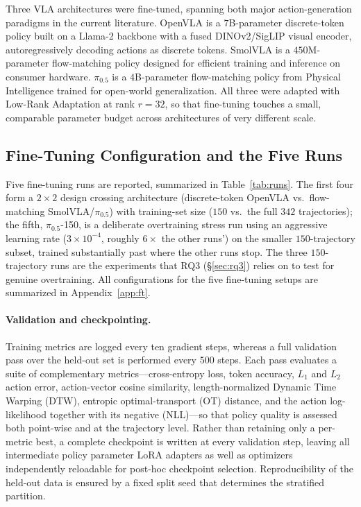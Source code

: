 \documentclass[english,12pt,a4paper,pdftex,elec,utf8]{aaltothesis}
\begin{document}
Three VLA architectures were fine-tuned, spanning both major action-generation paradigms in the current literature. OpenVLA \cite{kim2024openvla} is a $7$B-parameter discrete-token policy built on a Llama-2 backbone with a fused DINOv2/SigLIP visual encoder, autoregressively decoding actions as discrete tokens. SmolVLA \cite{shukor2025smolvla} is a $450$M-parameter flow-matching policy designed for efficient training and inference on consumer hardware. $\pi_{0.5}$ \cite{intelligence2025pi05} is a $4$B-parameter flow-matching policy from Physical Intelligence trained for open-world generalization. All
three were adapted with Low-Rank Adaptation \cite{hu2021loralowrankadaptationlarge} at rank $r{=}32$, so that fine-tuning touches a small, comparable parameter budget across architectures of very different scale.

\subsection{Fine-Tuning Configuration and the Five Runs}
\label{sec:implementation-runs}

Five fine-tuning runs are reported, summarized in Table~\ref{tab:runs}. The first four form a $2\times2$ design crossing architecture (discrete-token OpenVLA vs.\ flow-matching SmolVLA/$\pi_{0.5}$) with training-set size ($150$ vs.\ the full $342$ trajectories); the fifth, $\pi_{0.5}$-150, is a deliberate overtraining stress run using an aggressive learning rate ($3\times10^{-4}$, roughly $6\times$ the other runs') on the smaller $150$-trajectory subset, trained substantially past where the other runs stop. The three $150$-trajectory runs are the experiments that RQ3 (\S\ref{sec:rq3}) relies on to test for genuine overtraining. All configurations for the five fine-tuning setups are summarized in Appendix~\ref{app:ft}.

\paragraph{Validation and checkpointing.} Training metrics are logged every ten gradient steps, whereas a full validation pass over the held-out set is performed every $500$ steps. Each pass evaluates a suite of complementary metrics---cross-entropy loss, token accuracy, $L_1$ and $L_2$ action error, action-vector cosine similarity, length-normalized Dynamic Time Warping (DTW), entropic optimal-transport (OT) distance, and the action log-likelihood together with its negative (NLL)---so that policy quality is assessed both point-wise and at the trajectory level. Rather than retaining only a per-metric best, a complete checkpoint is written at every validation step, leaving all intermediate policy parameter LoRA adapters as well as optimizers independently reloadable for post-hoc checkpoint selection. Reproducibility of the held-out data is ensured by a fixed split seed that determines the stratified partition.
\end{document}
